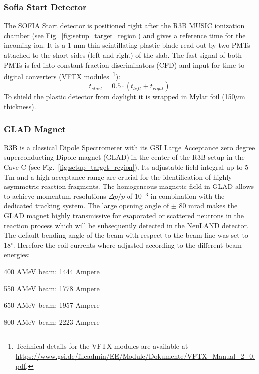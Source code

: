 \subsubsection{Sofia Start Detector}
The SOFIA Start detector is positioned right after the R3B MUSIC ionization chamber (see Fig.~\ref{fig:setup_target_region}) and gives a reference time for the incoming ion. It is a 1 mm thin scintillating plastic blade read out by two PMTs attached to the short sides (left and right) of the slab. The fast signal of both PMTs is fed into constant fraction discriminators (CFD) and input for time to digital converters (VFTX modules~\footnote{Technical details for the VFTX modules are available at \url{https://www.gsi.de/fileadmin/EE/Module/Dokumente/VFTX_Manual_2_0.pdf}.}):
\[t_{start} = 0.5 \cdot (t_{left}+t_{right}) \]\newline
To shield the plastic detector from daylight it is wrapped in Mylar foil (150$\mu$m thickness).
\subsubsection{GLAD Magnet}
R3B is a classical Dipole Spectrometer with its GSI Large Acceptance zero degree superconducting Dipole magnet (GLAD) in the center of the R3B setup in the Cave C (see Fig.~\ref{fig:setup_target_region}). Its adjustable field integral up to 5 Tm and a high acceptance range are crucial for the identification of highly asymmetric reaction fragments. The homogeneous magnetic field in GLAD allows to achieve momentum resolutions $\Delta p/p$ of 10$^{-3}$ in combination with the dedicated tracking system.\newline
The large opening angle of $\pm$ 80 mrad makes the GLAD magnet highly transmissive for evaporated or scattered neutrons in the reaction process which will be subsequently detected in the NeuLAND detector.\newline
The default bending angle of the beam with respect to the beam line was set to 18$^{\circ}$. Herefore the coil currents where adjusted according to the different beam energies:
\newenvironment{tight_enumerate}{
\begin{enumerate}
  \setlength{\itemsep}{0pt}
  \setlength{\parskip}{0pt}
}{\end{enumerate}}
\begin{tight_enumerate}
\item 400 AMeV beam: 1444 Ampere
\item 550 AMeV beam: 1778 Ampere
\item 650 AMeV beam: 1957 Ampere
\item 800 AMeV beam: 2223 Ampere
\end{tight_enumerate}

